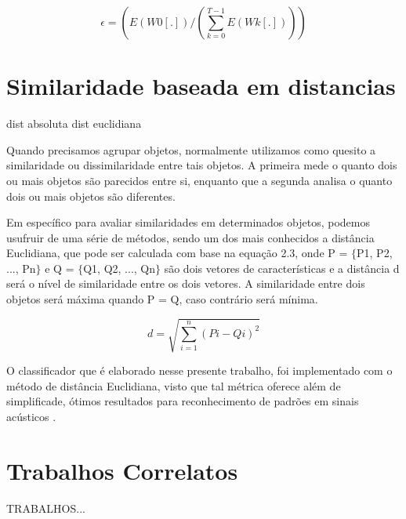 \documentclass[a4paper,12pt,twoside,openright]{report}
\begin{document}
\begin{equation}
	\epsilon = (E(W0[.]) / (\sum_{k = 0}^{T-1}E(Wk[.])))
\end{equation}  
\section{Similaridade baseada em distancias}
\label{similaridade_baseada_em_distancias}
dist absoluta
dist euclidiana

\par Quando precisamos agrupar objetos, normalmente utilizamos como quesito a similaridade ou dissimilaridade entre tais objetos. A primeira mede o quanto dois ou mais objetos s\~{a}o parecidos entre si, enquanto que a segunda analisa o quanto dois ou mais objetos s\~{a}o diferentes.

\par Em espec\'{i}fico para avaliar similaridades em determinados objetos, podemos usufruir de uma s\'{e}rie de m\'{e}todos, sendo um dos mais conhecidos a dist\^{a}ncia Euclidiana, que pode ser calculada com base na equa{\c c}\~{a}o 2.3, onde P = $\{$P1, P2, ..., Pn$\}$ e Q = $\{$Q1, Q2, ..., Qn$\}$ s\~{a}o dois vetores de caracter\'{i}sticas e a dist\^{a}ncia d ser\'{a} o n\'{i}vel de similaridade entre os dois vetores. A similaridade entre dois objetos ser\'{a} m\'{a}xima quando P = Q, caso contr\'{a}rio ser\'{a} m\'{i}nima.

\begin{equation}
	d =\sqrt{\sum_{i = 1}^{n}(Pi-Qi)^2}
\end{equation}

\par O classificador que \'{e} elaborado nesse presente trabalho, foi implementado com o m\'{e}todo de dist\^{a}ncia Euclidiana, visto que tal m\'{e}trica oferece al\'{e}m de simplificade, \'{o}timos resultados para reconhecimento de padr\~{o}es em sinais ac\'{u}sticos \cite{Marcel_Kfouri}.

\section{Trabalhos Correlatos}
\label{trabalhos_correlatos}

\par TRABALHOS...
\end{document}
